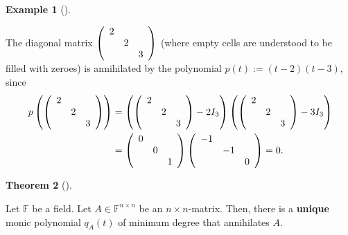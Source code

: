 \documentclass[numbers=enddot,12pt,final,onecolumn,notitlepage]{scrartcl}%
\numberwithin{exer}{subsection}
\theoremstyle{definition}
\newtheorem{theo}{Theorem}[subsection]
\newenvironment{theorem}[1][]
{\begin{theo}[#1]\begin{leftbar}}
{\end{leftbar}\end{theo}}
\newtheorem{exam}[theo]{Example}
\newenvironment{example}[1][]
{\begin{exam}[#1]\begin{leftbar}}
{\end{leftbar}\end{exam}}
\begin{document}
\begin{example}
The diagonal matrix $\left(
\begin{array}
[c]{ccc}%
2 &  & \\
& 2 & \\
&  & 3
\end{array}
\right)  $ (where empty cells are understood to be filled with zeroes) is
annihilated by the polynomial $p\left(  t\right)  :=\left(  t-2\right)
\left(  t-3\right)  $, since%
\begin{align*}
p\left(  \left(
\begin{array}
[c]{ccc}%
2 &  & \\
& 2 & \\
&  & 3
\end{array}
\right)  \right)   &  =\left(  \left(
\begin{array}
[c]{ccc}%
2 &  & \\
& 2 & \\
&  & 3
\end{array}
\right)  -2I_{3}\right)  \left(  \left(
\begin{array}
[c]{ccc}%
2 &  & \\
& 2 & \\
&  & 3
\end{array}
\right)  -3I_{3}\right) \\
&  =\left(
\begin{array}
[c]{ccc}%
0 &  & \\
& 0 & \\
&  & 1
\end{array}
\right)  \left(
\begin{array}
[c]{ccc}%
-1 &  & \\
& -1 & \\
&  & 0
\end{array}
\right)  =0.
\end{align*}

\end{example}

\begin{theorem}
\label{thm.jnf.mipo.unique}Let $\mathbb{F}$ be a field. Let $A\in
\mathbb{F}^{n\times n}$ be an $n\times n$-matrix. Then, there is a
\textbf{unique} monic polynomial $q_{A}\left(  t\right)  $ of minimum degree
that annihilates $A$.
\end{theorem}
\end{document}
